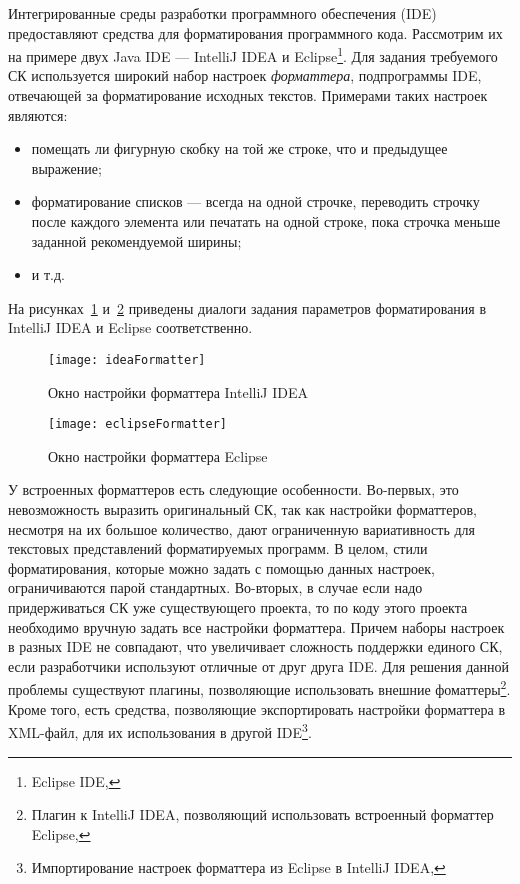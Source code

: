 Интегрированные среды разработки программного обеспечения
(IDE) предоставляют средства
для форматирования программного кода. Рассмотрим их на примере двух Java IDE ---
IntelliJ IDEA и Eclipse\footnote{Eclipse IDE, }.
Для задания требуемого СК используется широкий набор настроек \emph{форматтера},
подпрограммы IDE, отвечающей за форматирование исходных текстов.
Примерами таких настроек являются:
\begin{itemize}
  \item помещать ли фигурную скобку на той же строке, что и
    предыдущее выражение;
  \item форматирование списков --- всегда на одной строчке, переводить строчку после
    каждого элемента или печатать на одной строке,
    пока строчка меньше заданной рекомендуемой ширины;
  \item и т.д.
\end{itemize}
На рисунках~\ref{fig:ideaFormatter} и~\ref{fig:eclipseFormatter} приведены диалоги задания
параметров форматирования в IntelliJ IDEA и Eclipse соответственно.

\begin{figure}[p]
	\centering
	\texttt{[image: ideaFormatter]}
	\caption{Окно настройки форматтера IntelliJ IDEA}
	\label{fig:ideaFormatter}
\end{figure}

\begin{figure}[p]
	\centering
	\texttt{[image: eclipseFormatter]}
	\caption{Окно настройки форматтера Eclipse}
	\label{fig:eclipseFormatter}
\end{figure}

У встроенных форматтеров есть следующие особенности.
Во-первых, это невозможность выразить
оригинальный СК, так как настройки форматтеров, несмотря на их большое
количество,
дают ограниченную вариативность для текстовых представлений форматируемых
программ. В целом,
стили форматирования, которые можно задать с помощью данных настроек,
ограничиваются парой стандартных.
Во-вторых, в случае если надо
придерживаться СК уже существующего проекта, то по коду этого проекта необходимо
вручную задать все настройки форматтера.
Причем наборы настроек в разных IDE не совпадают, что увеличивает сложность
поддержки единого СК, если разработчики используют отличные от друг друга IDE.
Для решения данной проблемы существуют плагины, позволяющие использовать
внешние фоматтеры\footnote{Плагин к IntelliJ IDEA, позволяющий использовать
встроенный форматтер Eclipse, }.
Кроме того, есть средства, позволяющие экспортировать настройки форматтера в
XML-файл, для их использования в другой
IDE\footnote{Импортирование настроек форматтера из Eclipse в IntelliJ IDEA,
}.

